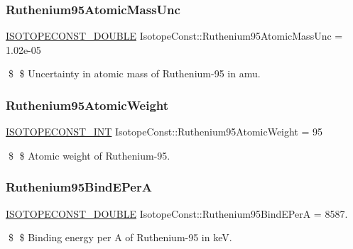 \subsubsection{\texorpdfstring{Ruthenium95\+Atomic\+Mass\+Unc}{Ruthenium95AtomicMassUnc}}
{\footnotesize\ttfamily \mbox{\hyperlink{group___isotope_const-_macros_ga8f45a7272ce02c0b4c65c44636ed719a}{I\+S\+O\+T\+O\+P\+E\+C\+O\+N\+S\+T\+\_\+\+D\+O\+U\+B\+LE}} Isotope\+Const\+::\+Ruthenium95\+Atomic\+Mass\+Unc = 1.\+02e-\/05}

\$ \$ Uncertainty in atomic mass of Ruthenium-\/95 in amu. \mbox{\label{group___isotope_const-_ruthenium-_ru95_ga7cd0219c62d31c6b2f9ae3acb9519388}} 
\subsubsection{\texorpdfstring{Ruthenium95\+Atomic\+Weight}{Ruthenium95AtomicWeight}}
{\footnotesize\ttfamily \mbox{\hyperlink{group___isotope_const-_macros_ga5f18360b3e99483a35c32d789e62621c}{I\+S\+O\+T\+O\+P\+E\+C\+O\+N\+S\+T\+\_\+\+I\+NT}} Isotope\+Const\+::\+Ruthenium95\+Atomic\+Weight = 95}

\$ \$ Atomic weight of Ruthenium-\/95. \mbox{\label{group___isotope_const-_ruthenium-_ru95_gacfda04a39f39816e1f53b64ba13f0999}} 
\subsubsection{\texorpdfstring{Ruthenium95\+Bind\+E\+PerA}{Ruthenium95BindEPerA}}
{\footnotesize\ttfamily \mbox{\hyperlink{group___isotope_const-_macros_ga8f45a7272ce02c0b4c65c44636ed719a}{I\+S\+O\+T\+O\+P\+E\+C\+O\+N\+S\+T\+\_\+\+D\+O\+U\+B\+LE}} Isotope\+Const\+::\+Ruthenium95\+Bind\+E\+PerA = 8587.}

\$ \$ Binding energy per A of Ruthenium-\/95 in keV. \mbox{\label{group___isotope_const-_ruthenium-_ru95_gaea03db8d548541315dcee765b77226f2}} 
